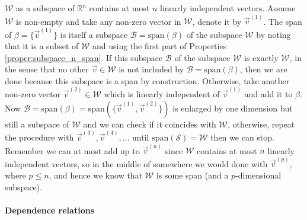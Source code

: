 $\mathcal{W}$ as a subspace of $\mathbb{R}^n$ contains at most $n$ linearly independent vectors. Assume $\mathcal{W}$ is non-empty and take any non-zero vector in $\mathcal{W}$, denote it by $\vec{v}^{(1)}$. The span of $\mathcal{\beta} = \{\vec{v}^{(1)}\}$ is itself a subspace $\mathcal{B} = \text{span}(\mathcal{\beta})$ of the subspace $\mathcal{W}$ by noting that it is a subset of $\mathcal{W}$ and using the first part of Properties \ref{proper:subspace_n_span}. If this subspace $\mathcal{B}$ of the subspace $\mathcal{W}$ is exactly $\mathcal{W}$, in the sense that no other $\vec{v} \in \mathcal{W}$ is not included by $\mathcal{B} = \text{span}(\mathcal{\beta})$, then we are done because this subspace is a span by construction. Otherwise, take another non-zero vector $\vec{v}^{(2)} \in \mathcal{W}$ which is linearly independent of $\vec{v}^{(1)}$ and add it to $\mathcal{\beta}$. Now $\mathcal{B} = \text{span}(\mathcal{\beta}) = \text{span}(\{\vec{v}^{(1)}, \vec{v}^{(2)}\})$ is enlarged by one dimension but still a subspace of $\mathcal{W}$ and we can check if it coincides with $\mathcal{W}$, otherwise, repeat the procedure with $\vec{v}^{(3)}, \vec{v}^{(4)}, \ldots$ until $\text{span}(\mathcal{S}) = \mathcal{W}$ then we can stop. Remember we can at most add up to $\vec{v}^{(n)}$ since $\mathcal{W}$ contains at most $n$ linearly independent vectors, so in the middle of somewhere we would done with $\vec{v}^{(p)}$, where $p \leq n$, and hence we know that $\mathcal{W}$ is some span (and a $p$-dimensional subspace).

\paragraph{Dependence relations}

